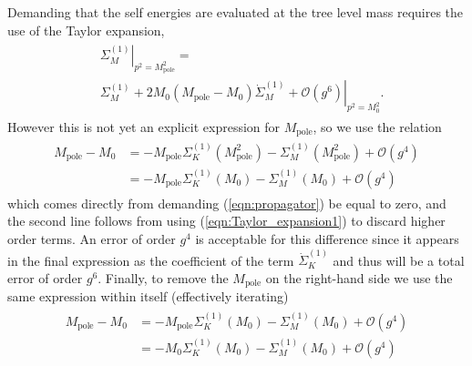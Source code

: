 \documentclass[11pt]{article}
\renewcommand{\d}{\ensuremath{\operatorname{d}\!}}
\def\Mp{M_{\text{pole}}}
\begin{document}

Demanding that the self energies are evaluated at the tree level mass requires the use of the Taylor expansion,
\begin{align}
\begin{split}
&\left.\Sigma^{(1)}_M\right|_{p^2=\Mp^2}=\\&\left.\Sigma^{(1)}_M+2M_0(\Mp-M_0)\dot{\Sigma}^{(1)}_M+\mathcal{O}\left(g^6\right)\right|_{p^2=M_0^2}. \label{eqn:Taylor_expansion1}
\end{split}
\end{align}
However this is not yet an explicit expression for $\Mp$, so we use the relation
\begin{align}
\begin{split}
\Mp-M_0&=-\Mp\Sigma^{(1)}_K(\Mp^2)-\Sigma^{(1)}_M(\Mp^2)+\mathcal{O}(g^4)\\
&=-\Mp\Sigma^{(1)}_K(M_0)-\Sigma^{(1)}_M(M_0)+\mathcal{O}(g^4)\label{eqn:mass_diff}
\end{split}
\end{align}
which comes directly from demanding  (\ref{eqn:propagator}) be equal to zero, and the second line follows from using (\ref{eqn:Taylor_expansion1}) to discard higher order terms.  An error of order $g^4$ is acceptable for this difference since it appears in the final expression as the coefficient of the term $\dot{\Sigma}^{(1)}_K$ and thus will be a total error of order $g^6$.  Finally, to remove the $\Mp$ on the right-hand side we use the same expression within itself (effectively iterating)
\begin{align}
\begin{split}
\Mp-M_0&=-\Mp\Sigma^{(1)}_K(M_0)-\Sigma^{(1)}_M(M_0)+\mathcal{O}(g^4)\\
&=-M_0\Sigma^{(1)}_K(M_0)-\Sigma^{(1)}_M(M_0)+\mathcal{O}(g^4)\label{eqn:M0Mp}\\
\end{split}
\end{align}
\end{document}
